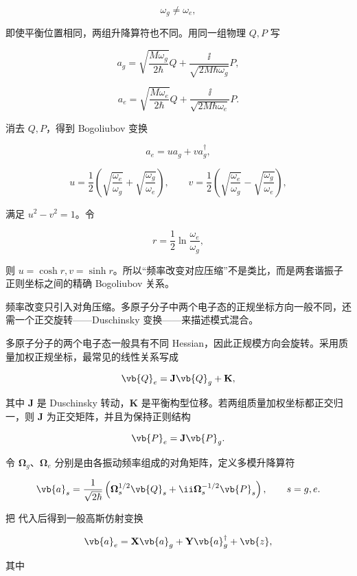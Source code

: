 \[
\omega_g\neq\omega_e,
\]

即使平衡位置相同，两组升降算符也不同。用同一组物理 \(Q,P\) 写

\[
a_g
=\sqrt{\frac{M\omega_g}{2\hbar}}Q
+\frac{\ii}{\sqrt{2M\hbar\omega_g}}P,
\]

\[
a_e
=\sqrt{\frac{M\omega_e}{2\hbar}}Q
+\frac{\ii}{\sqrt{2M\hbar\omega_e}}P.
\]

消去 \(Q,P\)，得到 Bogoliubov 变换

\[
a_e
=u a_g+v a_g^\dagger,
\]

\[
u=\frac12\left(
\sqrt{\frac{\omega_e}{\omega_g}}
+\sqrt{\frac{\omega_g}{\omega_e}}
\right),
\qquad
v=\frac12\left(
\sqrt{\frac{\omega_e}{\omega_g}}
-\sqrt{\frac{\omega_g}{\omega_e}}
\right),
\]

满足 \(u^2-v^2=1\)。令

\[
r=\frac12\ln\frac{\omega_e}{\omega_g},
\]

则 \(u=\cosh r,v=\sinh r\)。所以“频率改变对应压缩”不是类比，而是两套谐振子正则坐标之间的精确 Bogoliubov 关系。

频率改变只引入对角压缩。多原子分子中两个电子态的正规坐标方向一般不同，还需一个正交旋转——Duschinsky 变换——来描述模式混合。

多原子分子的两个电子态一般具有不同 Hessian，因此正规模方向会旋转。采用质量加权正规坐标，最常见的线性关系写成

\begin{equation}
\vb{Q}_e
=\mathbf J\vb{Q}_g+\mathbf K,
\label{eq:duschinsky}
\end{equation}

其中 \(\mathbf J\) 是 Duschinsky 转动，\(\mathbf K\) 是平衡构型位移。若两组质量加权坐标都正交归一，则 \(\mathbf J\) 为正交矩阵，并且为保持正则结构

\[
\vb{P}_e=\mathbf J\vb{P}_g.
\]

令 \(\boldsymbol\Omega_g\)、\(\boldsymbol\Omega_e\) 分别是由各振动频率组成的对角矩阵，定义多模升降算符

\[
\vb{a}_s
=\frac1{\sqrt{2\hbar}}
\left(
\boldsymbol\Omega_s^{1/2}\vb{Q}_s
+\ii\boldsymbol\Omega_s^{-1/2}\vb{P}_s
\right),
\qquad s=g,e.
\]

把  代入后得到一般高斯仿射变换

\begin{equation}
\vb{a}_e
=\mathbf X\vb{a}_g
+\mathbf Y\vb{a}_g^\dagger
+\vb{z},
\label{eq:doktorov-bogoliubov}
\end{equation}

其中

